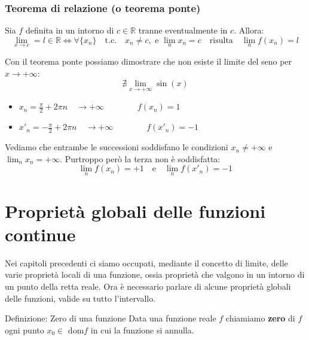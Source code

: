 \documentclass[x11names]{article}
\begin{document}
	\begin{center}
		\colorbox{myred}{\begin{minipage}{5.75in}
				\begin{redes}{}
					\subsubsection{Teorema di relazione (o teorema ponte)}
					Sia $f$ definita in un intorno di $c \in \mathbb{R}$ tranne eventualmente in $c$. Allora:
					\[
					\lim_{x \to c} = l \in \mathbb{R} \Longleftrightarrow \forall \{x_n\} \quad \text{t.c.} \quad x_n \neq c, \text{ e } \lim_{n}x_n = c\quad \text{risulta} \quad \lim_{n} f(x_n) = l
					\]
				\end{redes}
		\end{minipage}}        
	\end{center}
	Con il teorema ponte possiamo dimostrare che non esiste il limite del seno per $x \to +\infty$:
	\[
	\nexists \lim_{x \to +\infty}\sin(x)
	\]
	\begin{itemize}
		\item $x_n = \frac{\pi}{2} + 2 \pi n \quad \to +\infty \qquad \qquad f(x_n) = 1$
		\item $x'_n = -\frac{\pi}{2} + 2 \pi n \quad \to +\infty\qquad \qquad f(x'_n) = -1$
	\end{itemize}
	Vediamo che entrambe le successioni soddisfano le condizioni $x_n \neq +\infty$ e $\lim_{n}x_n = +\infty$. Purtroppo però la terza non è soddisfatta:
	\[
	\lim_{n}f(x_n) = +1 \quad \text{e} \quad \lim_{n}f(x'_n) = -1
	\]
	\newpage
	\section{Proprietà globali delle funzioni continue}
	Nei capitoli precedenti ci siamo occupati, mediante il concetto di limite, delle varie proprietà locali di una funzione, ossia proprietà che valgono in un intorno di un punto della retta reale. Ora è necessario parlare di alcune proprietà globali delle funzioni, valide su tutto l'intervallo.
	
	\begin{center}
		\colorbox{myblue}{\begin{minipage}{5.75in}
				\begin{blues}{Definizione: Zero di una funzione}
					Data una funzione reale $f$ chiamiamo \textbf{zero} di $f$ ogni punto $x_0 \in$ dom$f$ in cui la funzione si annulla.
				\end{blues}
		\end{minipage}}        
	\end{center}
	
\end{document}
